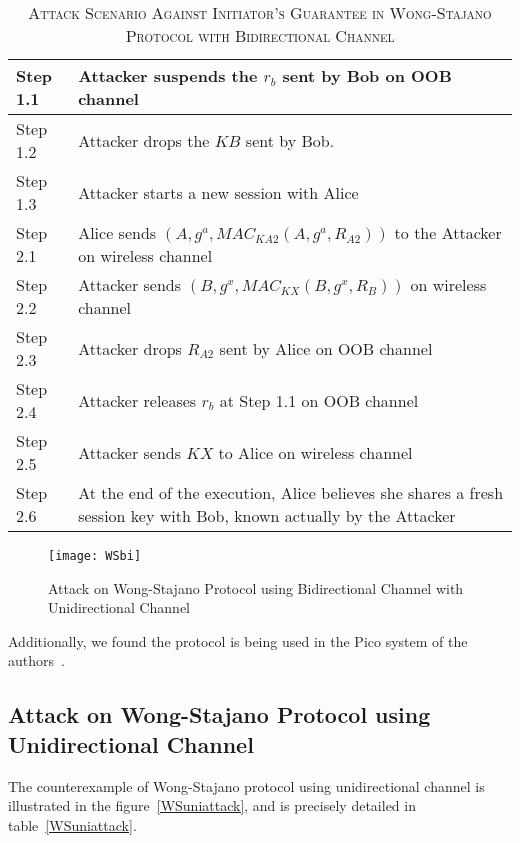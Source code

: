 \begin{table}[t]
\centering
\caption{\textsc{Attack Scenario Against Initiator's Guarantee in Wong-Stajano Protocol with Bidirectional Channel}}
\label{WSbiattacktable}
{\small
\begin{tabular}{| l | p{11cm} |}
 \hline
 Step 1.1 & Attacker suspends the $r_b$ sent by Bob on OOB channel\\ \hline
 Step 1.2 & Attacker drops the $KB$ sent by Bob. \\ \hline
 Step 1.3 & Attacker starts a new session with Alice\\ \hline \hline
 Step 2.1 & Alice sends $(A, g^{a}, MAC_{KA2}(A,g^{a},R_{A2}))$ to the Attacker on wireless channel\\ \hline
 Step 2.2 & Attacker sends $(B, g^{x}, MAC_{KX}(B,g^{x},R_{B}))$ on wireless channel\\ \hline
 Step 2.3 & Attacker drops $R_{A2}$ sent by Alice on OOB channel\\ \hline
 Step 2.4 & Attacker releases $r_b$ at Step 1.1 on OOB channel \\ \hline
 Step 2.5 & Attacker sends $KX$ to Alice on wireless channel\\ \hline
 Step 2.6 & At the end of the execution, Alice believes she shares a fresh session key with Bob, known actually by the Attacker\\ \hline
\end{tabular}
}
\end{table}

\begin{figure}
  \centering
  \texttt{[image: WSbi]}
  \caption{Attack on Wong-Stajano Protocol using Bidirectional Channel with Unidirectional Channel}
  \label{WSbiattack}
\end{figure}

Additionally, we found the protocol is being used in the Pico system of the authors~\cite{Stajano:2014aa}. 
 
\subsection{Attack on Wong-Stajano Protocol using Unidirectional Channel}

The counterexample of Wong-Stajano protocol using unidirectional channel is illustrated in the figure~\ref{WSuniattack}, and is precisely detailed in table~\ref{WSuniattack}. 

